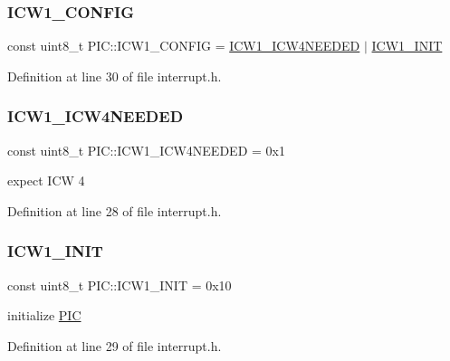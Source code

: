 \subsubsection{\texorpdfstring{I\+C\+W1\+\_\+\+C\+O\+N\+F\+IG}{ICW1\_CONFIG}}
{\footnotesize\ttfamily const uint8\+\_\+t P\+I\+C\+::\+I\+C\+W1\+\_\+\+C\+O\+N\+F\+IG = \hyperlink{namespace_p_i_c_a63beb0c60fdab8c997f42291a7c2baf5}{I\+C\+W1\+\_\+\+I\+C\+W4\+N\+E\+E\+D\+ED} $\vert$ \hyperlink{namespace_p_i_c_a8bb2fc0a772eabbbf6adb002f578290e}{I\+C\+W1\+\_\+\+I\+N\+IT}}



Definition at line 30 of file interrupt.\+h.

\mbox{\label{namespace_p_i_c_a63beb0c60fdab8c997f42291a7c2baf5}} 
\subsubsection{\texorpdfstring{I\+C\+W1\+\_\+\+I\+C\+W4\+N\+E\+E\+D\+ED}{ICW1\_ICW4NEEDED}}
{\footnotesize\ttfamily const uint8\+\_\+t P\+I\+C\+::\+I\+C\+W1\+\_\+\+I\+C\+W4\+N\+E\+E\+D\+ED = 0x1}



expect I\+CW 4 



Definition at line 28 of file interrupt.\+h.

\mbox{\label{namespace_p_i_c_a8bb2fc0a772eabbbf6adb002f578290e}} 
\subsubsection{\texorpdfstring{I\+C\+W1\+\_\+\+I\+N\+IT}{ICW1\_INIT}}
{\footnotesize\ttfamily const uint8\+\_\+t P\+I\+C\+::\+I\+C\+W1\+\_\+\+I\+N\+IT = 0x10}



initialize \hyperlink{namespace_p_i_c}{P\+IC} 



Definition at line 29 of file interrupt.\+h.

\mbox{\label{namespace_p_i_c_a4eada3349fe4b6740074b1adecdb080b}} 
